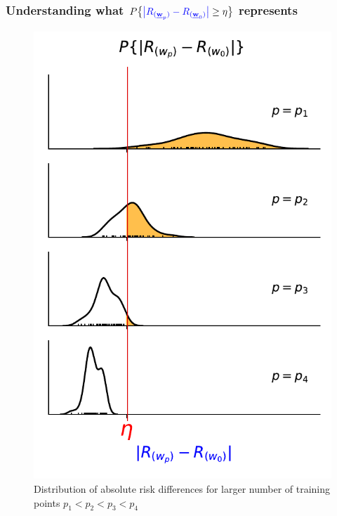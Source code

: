 \begin{frame}
\label{sec:convergence_erm}
\frametitle{ Understanding what $P\big\{ 
	{\color{question1}
		\big|R_{(\vec w_p)} - R_{(\vec w_0)}\big| 
	} \geq \eta \big\}$ represents
}

\begin{figure}
	\includegraphics[height=\slidesonly{6.7cm}{\notesonly{8cm}}]{img/PdeltaReta}
	\caption{Distribution of absolute risk differences for larger number of training points $p_{1} < p_{2} < p_{3} < p_{4}$}
	\label{fig:PdeltaReta}
\end{figure}
	

\end{frame}
